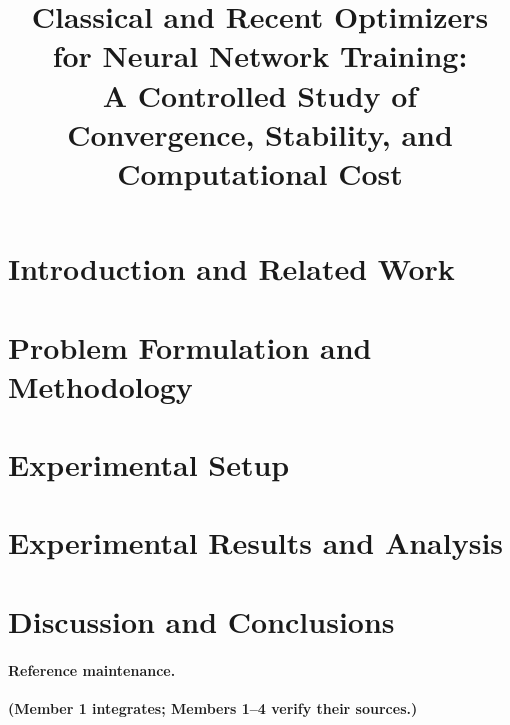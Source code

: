 \documentclass{article}
\title{Classical and Recent Optimizers for Neural Network Training:\\
A Controlled Study of Convergence, Stability, and Computational Cost}
\newcommand{\owner}[1]{\textcolor{blue!55!black}{\textbf{(#1)}}}
\begin{document}
\maketitle

\section{Introduction and Related Work}

\section{Problem Formulation and Methodology}






\section{Experimental Setup}




\FloatBarrier
\section{Experimental Results and Analysis}





\section{Discussion and Conclusions}





\paragraph{Reference maintenance.}\owner{Member 1 integrates; Members 1--4 verify their sources.}


\end{document}
